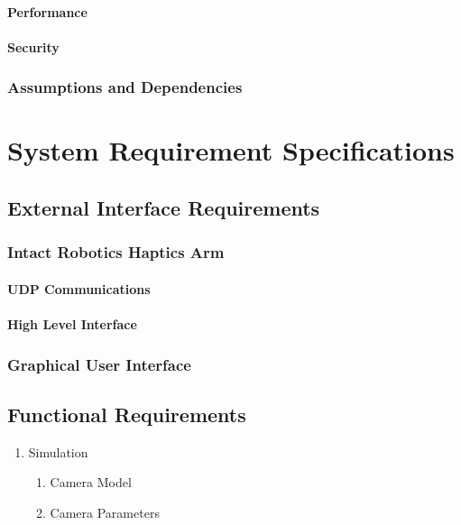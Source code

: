 \documentclass[11pt]{book}
\begin{document}
\subsubsection{Performance}

\subsubsection{Security} 
 
\subsection{Assumptions and Dependencies}

\chapter{System Requirement Specifications}

\section{External Interface Requirements}

\subsection{Intact Robotics Haptics Arm}

\subsubsection{UDP Communications}

\subsubsection{High Level Interface}

\subsection{Graphical User Interface}


\section{Functional Requirements}

\begin{enumerate}
\item Simulation
\begin{enumerate}
	\item Camera Model
	\item Camera Parameters 
\end{enumerate}
\end{enumerate}
\end{document}
